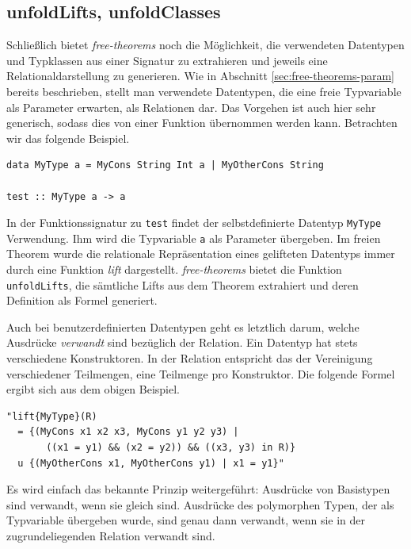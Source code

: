 \subsection{unfoldLifts, unfoldClasses}

Schließlich bietet \textit{free-theorems} noch die Möglichkeit, die verwendeten Datentypen und Typklassen aus einer
Signatur zu extrahieren und jeweils eine Relationaldarstellung zu generieren. Wie in Abschnitt \ref{sec:free-theorems-param}
bereits beschrieben, stellt man verwendete Datentypen, die eine freie Typvariable als Parameter erwarten, als Relationen
dar. Das Vorgehen ist auch hier sehr generisch, sodass dies von einer Funktion übernommen werden kann. Betrachten wir
das folgende Beispiel.

\begin{verbatim}
data MyType a = MyCons String Int a | MyOtherCons String

test :: MyType a -> a
\end{verbatim}

In der Funktionssignatur zu \texttt{test} findet der selbstdefinierte Datentyp \texttt{MyType} Verwendung. Ihm wird die
Typvariable \texttt{a} als Parameter übergeben. Im freien Theorem wurde die relationale Repräsentation eines gelifteten
Datentyps immer durch eine Funktion \textit{lift} dargestellt. \textit{free-theorems} bietet die Funktion \texttt{unfoldLifts},
die sämtliche Lifts aus dem Theorem extrahiert und deren Definition als Formel generiert.

Auch bei benutzerdefinierten Datentypen geht es letztlich darum, welche Ausdrücke \textit{verwandt} sind bezüglich der
Relation. Ein Datentyp hat stets verschiedene Konstruktoren. In der Relation entspricht das der Vereinigung verschiedener
Teilmengen, eine Teilmenge pro Konstruktor. Die folgende Formel ergibt sich aus dem obigen Beispiel.

\begin{verbatim}
"lift{MyType}(R)
  = {(MyCons x1 x2 x3, MyCons y1 y2 y3) |
       ((x1 = y1) && (x2 = y2)) && ((x3, y3) in R)}
  u {(MyOtherCons x1, MyOtherCons y1) | x1 = y1}"
\end{verbatim}

Es wird einfach das bekannte Prinzip weitergeführt: Ausdrücke von Basistypen sind verwandt, wenn sie gleich sind. Ausdrücke
des polymorphen Typen, der als Typvariable übergeben wurde, sind genau dann verwandt, wenn sie in der zugrundeliegenden
Relation verwandt sind.

